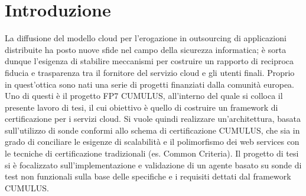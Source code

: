 \documentclass[../main.tex]{subfiles}
\begin{document}
\chapter*{Introduzione}

La diffusione del modello cloud per l’erogazione in outsourcing di applicazioni distribuite ha posto nuove sfide
nel campo della sicurezza informatica; è sorta dunque l’esigenza di stabilire meccanismi per costruire un rapporto
di reciproca fiducia e trasparenza tra il fornitore del servizio cloud e gli utenti finali. Proprio in quest’ottica sono
nati una serie di progetti finanziati dalla comunità europea. Uno di questi è il progetto FP7 CUMULUS, all’interno
del quale si colloca il presente lavoro di tesi, il cui obiettivo è quello di costruire un framework di certificazione
per i servizi cloud. Si vuole quindi realizzare un’architettura, basata sull’utilizzo di sonde conformi allo schema di
certificazione CUMULUS, che sia in grado di conciliare le esigenze di scalabilità e il polimorfismo dei web services
con le tecniche di certificazione tradizionali (es. Common Criteria).
Il progetto di tesi si è focalizzato sull'implementazione e validazione di un agente basato su sonde di test non
funzionali sulla base delle specifiche e i requisiti dettati dal framework CUMULUS.
\end{document}
